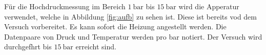 Für die Hochdruckmessung im Bereich $\SI{1}{\bar}$ bis $\SI{15}{\bar}$ wird die Apperatur verwendet, welche in Abbildung \ref{fig:aufb} zu sehen ist.
Diese ist bereits vod dem Versuch vorbereitet. Es kann sofort die Heizung angestellt werden. Die Datenpaare von Druck und Temperatur werden pro bar notiert. Der Versuch wird durchgefhrt bis $\SI{15}{\bar}$ erreicht sind.